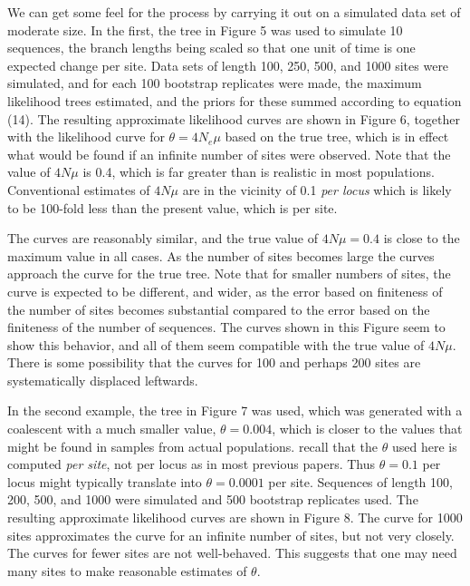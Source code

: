 We can get some feel for the process by carrying it out on a simulated data set
of moderate size.  In the first, the tree in Figure 5 was used to simulate 10
sequences,
the branch lengths being scaled so that one unit of time is one expected
change per site.  Data sets of length 100, 250, 500, and 1000 sites were
simulated, and for each 100 bootstrap replicates were made, the maximum
likelihood trees estimated, and the priors for these summed according to
equation (14).  The resulting approximate likelihood curves are shown in
Figure 6, together with the likelihood curve for $\theta = 4N_e\mu$ based on the true
tree, which is in effect what would be found if an infinite number of sites
were observed.  Note that the value of $4N\mu$ is 0.4, which is far greater
than is realistic in most populations.  Conventional estimates of $4N\mu$ are
in the vicinity of 0.1 {\it per locus} which is likely to be 100-fold
less than the present value, which is per site.

The curves are reasonably similar, and the true value of $4N\mu = 0.4$ is
close to the maximum value in all cases.  As the number of sites becomes
large the curves approach the curve for the true tree.  Note that for
smaller numbers of sites, the curve is expected to be different, and
wider, as the error based on finiteness of the number of sites becomes
substantial compared to the error based on the finiteness of the number of
sequences.  The curves shown in this Figure seem to show this behavior, and
all of them seem compatible with the true value of $4N\mu$.  There is some
possibility that the curves for 100 and perhaps 200 sites are systematically
displaced leftwards.


In the second example, the tree in Figure 7 was used, which was generated
with a coalescent with a much smaller value, $\theta = 0.004$, which is
closer to the values that might be found in samples from actual
populations.  recall that the $\theta$ used here is computed {\it per site},
not per locus as in most previous papers.  Thus $\theta = 0.1$ per locus might
typically translate into $\theta = 0.0001$ per site.  Sequences of length
100, 200, 500, and 1000 were simulated and 500 bootstrap replicates used.
The resulting approximate likelihood curves are shown in Figure 8.  The
curve for 1000 sites approximates the curve for an infinite number of sites,
but not very closely.  The curves for fewer sites are not well-behaved.  This
suggests that one may need many sites to make reasonable estimates of
$\theta$.

